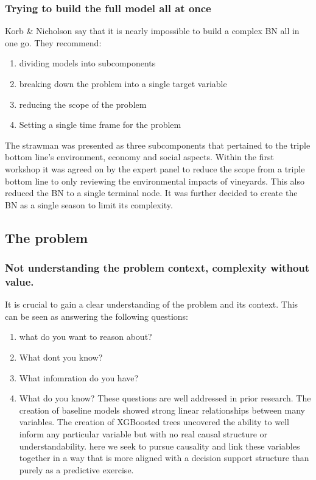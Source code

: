 \subsubsection{Trying to build the full model all at once}
Korb & Nicholson say that it is nearly impossible to build a complex BN all in one go. They recommend:
\begin{enumerate}
        \item dividing models into subcomponents
        \item breaking down the problem into a single target variable
        \item reducing the scope of the problem
        \item Setting a single time frame for the problem
\end{enumerate}
The strawman was presented as three subcomponents that pertained to the triple bottom line's environment, economy and social aspects.
Within the first workshop it was agreed on by the expert panel to reduce the scope from a triple bottom line to only reviewing the environmental impacts of vineyards. This also reduced the BN to a single terminal node. It was further decided to create the BN as a single season to limit its complexity.

\subsection{The problem}
\subsubsection{Not understanding the problem context, complexity without value.}
It is crucial to gain a clear understanding of the problem and its context. This can be seen as answering the following questions:
\begin{enumerate}
        \item what do you want to reason about?
        \item What dont you know?
        \item What infomration do you have?
        \item What do you know?
These questions are well addressed in prior research. The creation of baseline models showed strong linear relationships between many variables. The creation of XGBoosted trees uncovered the ability to well inform any particular variable but with no real causal structure or understandability. here we seek to pursue causality and link these variables together in a way that is more aligned with a decision support structure than purely as a predictive exercise.
\end{enumerate}
